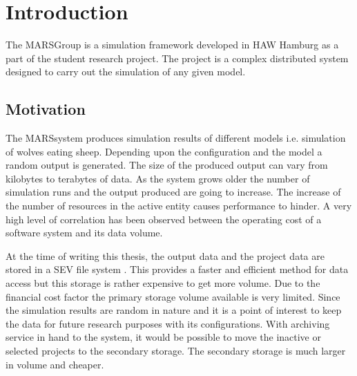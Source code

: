 \newpage
\chapter{Introduction}

The MARS\footnotemark Group  is a simulation framework developed 
in HAW Hamburg as a  part of the student research project. The project is a complex 
distributed system designed to carry  out the simulation of any given model. 
\cite{HAWHamburgMARS}
    \section{Motivation}
    The MARS\footnotemark[\value{footnote}] system produces simulation results of 
    different models i.e. simulation of wolves eating sheep. Depending upon the 
    configuration and the model a random output is generated. The size of the produced
    output can vary from kilobytes to terabytes of data. As the system grows older the 
    number of simulation runs and the output produced are going to increase. The increase
    of the number of resources in the active entity causes performance to hinder. 
    A very high level of correlation has been observed between the operating cost of a software 
    system and its data volume. 
    
    
    \par

    At the time of writing this thesis, the output data and the project data are stored in a
    SEV file system \cite{SEV}. This provides a faster and efficient method for data
    access but this storage is rather expensive to get more volume. Due to the financial cost 
    factor the primary storage volume available is very limited. Since the simulation 
    results are random in nature and it is a point of interest to keep the data for future
    research purposes with its configurations. With archiving service in hand to the system, 
    it would be possible to move the inactive or selected projects to the secondary storage. 
    The secondary storage is much larger in volume and cheaper. 
    
    \par

